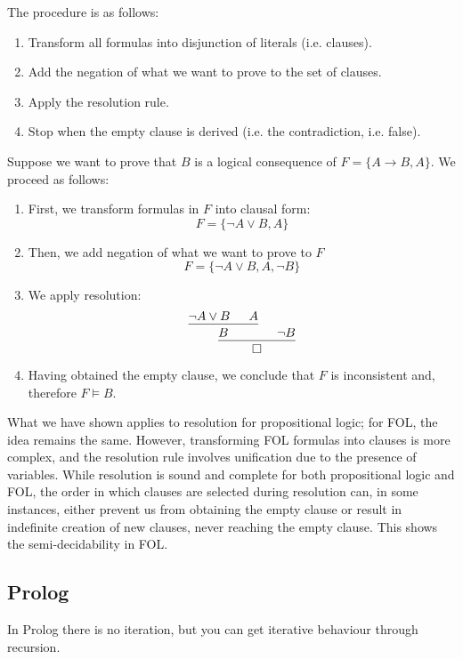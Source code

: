 \documentclass{article}
\begin{document}
The procedure is as follows:
\begin{enumerate}
    \item Transform all formulas into disjunction of literals (i.e.
        clauses).
    \item Add the negation of what we want to prove to the set of clauses.
    \item Apply the resolution rule.
    \item Stop when the empty clause is derived (i.e. the contradiction, i.e.
        false).
\end{enumerate}
\begin{example}
    Suppose we want to prove that $B$ is a logical consequence of $F=\{A\to
    B,A\}$. We proceed as follows:
    \begin{enumerate}
        \item First, we transform formulas in $F$ into clausal form:
            $$F=\{\neg A\lor B, A\}$$
        \item Then, we add negation of what we want to prove to $F$
            $$F=\{\neg A\lor B,A,\neg B\}$$
        \item We apply resolution:
            $$\begin{prooftree}
                \hypo{\neg A\lor B}\hypo{A}
                \infer2{B}\hypo{\neg B}
                \infer2{\square}
            \end{prooftree}$$
        \item Having obtained the empty clause, we conclude that $F$ is
            inconsistent and, therefore $F\models B$.
    \end{enumerate}
\end{example}
What we have shown applies to resolution for propositional logic; for FOL, the
idea remains the same. However, transforming FOL formulas into clauses is more
complex, and the resolution rule involves unification due to the presence of
variables.
While resolution is sound and complete for both propositional logic and FOL,
the order in which clauses are selected during resolution can, in some
instances, either prevent us from obtaining the empty clause or result in
indefinite creation of new clauses, never reaching the empty clause. This
shows the semi-decidability in FOL.
\subsection{Prolog}
In Prolog there is no iteration, but you can get iterative behaviour through
recursion.
\end{document}
